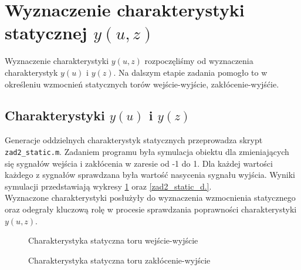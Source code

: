\section{Wyznaczenie charakterystyki statycznej $y(u,z)$}
Wyznaczenie charakterystyki $y(u,z)$ rozpoczęliśmy od wyznaczenia charakterystyk $y(u)$ i $y(z)$. Na dalszym etapie zadania pomogło to w określeniu wzmocnień statycznych torów wejście-wyjście, zakłócenie-wyjśćie. 

\subsection{Charakterystyki $y(u)$ i $y(z)$}
Generacje oddzielnych charakterystyk statycznych przeprowadza skrypt \verb+zad2_static.m+. Zadaniem programu była symulacja obiektu dla zmieniających się sygnałów wejścia i zakłócenia w zaresie od -1 do 1. Dla każdej wartości każdego z sygnałów sprawdzana była wartość nasycenia sygnału wyjścia. Wyniki symulacji przedstawiają wykresy \ref{zad2_static_u} oraz \ref{zad2_static_d.}.\\
\indent{} Wyznaczone charakterystyki posłużyły do wyznaczenia wzmocnienia statycznego oraz odegrały kluczową rolę w procesie sprawdzania poprawności charakterystyki $y(u,z)$.


\begin{figure}[t]
    \centering
    \caption{Charakterystyka statyczna toru wejście-wyjście}
    \label{zad2_static_u}
\end{figure}

\begin{figure}[b]
    \centering
    \caption{Charakterystyka statyczna toru zakłócenie-wyjście}
    \label{zad2_static_d}
\end{figure}
 
